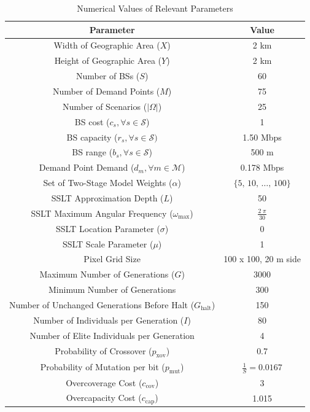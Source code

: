 \documentclass[onecolumn,draftcls]{IEEEtran}
\begin{document}
\begin{table} \centering
\caption{Numerical Values of Relevant Parameters}
\begin{tabular}{|c|c|} 
\hline
\textbf{Parameter} & \textbf{Value} \\
\hline
\hline 
Width of Geographic Area ($X$) & 2 km \\
\hline
Height of Geographic Area ($Y$) & 2 km \\
\hline
Number of BSs ($S$) & 60 \\ 
\hline 
Number of Demand Points ($M$) & 75 \\ 
\hline 
Number of Scenarios ($|\Omega|$) & 25 \\ 
\hline 
BS cost ($c_s, \forall s \in \mathcal{S}$) & 1 \\ 
\hline 
BS capacity ($r_s, \forall s \in \mathcal{S})$ & 1.50 Mbps \\ 
\hline
BS range ($b_s, \forall s \in \mathcal{S}$) & 500 m \\
\hline 
Demand Point Demand ($d_m, \forall m \in \mathcal{M}$) & 0.178 Mbps \\ 
\hline 
Set of Two-Stage Model Weights ($\alpha$) & $\{5,\, 10,\, \ldots,\, 100\}$ \\ 
\hline 
\hline
SSLT Approximation Depth ($L$) & 50 \\ 
\hline
SSLT Maximum Angular Frequency ($\omega_{\max}$) & $\frac{2 \; \pi}{30}$ \\
\hline 
SSLT Location Parameter ($\sigma$) & 0 \\ 
\hline 
SSLT Scale Parameter ($\mu$) & 1 \\ 
\hline
Pixel Grid Size & 100 x 100, 20 m side\\
\hline 
\hline
Maximum Number of Generations ($G$) & 3000 \\ 
\hline
Minimum Number of Generations & 300 \\
\hline
Number of Unchanged Generations Before Halt ($G_\text{halt}$) & 150 \\
\hline 
Number of Individuals per Generation ($I$) & 80 \\ 
\hline
Number of Elite Individuals per Generation & 4 \\
\hline 
Probability of Crossover ($p_\text{xov}$) & 0.7 \\ 
\hline
Probability of Mutation per bit ($p_\text{mut}$) & $\frac{1}{S} = 0.0167$ \\
\hline 
Overcoverage Cost ($c_\text{cov}$) & 3 \\
\hline
Overcapacity Cost ($c_\text{cap}$) & 1.015 \\
\hline
\end{tabular}
\label{tab:simval}
\end{table}
\end{document}
